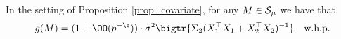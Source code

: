 



\iffalse

 \begin{claim}\label{claim_covar_shift}
		In the setting of Proposition \ref{prop_covariate}, for any $M\in \cal S_\mu$ we have that
		\[ g(M)=(1+\OO(p^{-\e}))\cdot \sigma^2  \bigtr{\Sigma_2(X_1^{\top}X_1  + X_2^{\top}X_2)^{-1} }  \quad \text{w.h.p.} \]
	\end{claim}


